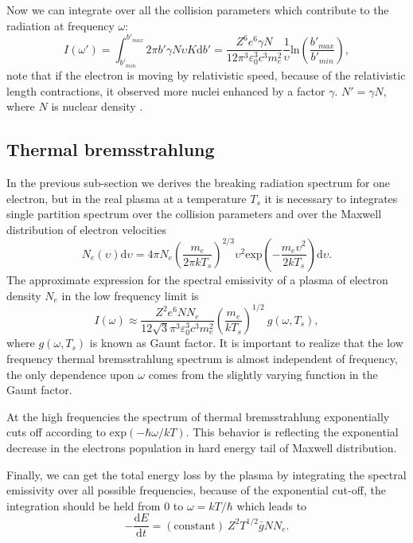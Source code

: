 \documentclass[oneside,a4paper,11pt]{report}
\begin{document}
Now we can integrate over all the collision parameters which contribute to the radiation at frequency 
$\omega$: 
\begin{equation}
 \label{brems_final}
I(\omega') = \int_{b'_{min}}^{b'_{max}} 2 \pi b' \gamma N \upsilon K \mathrm{d}b' = \frac{Z^6 e^6 \gamma N}{12\pi^3 \varepsilon_0^3 c^3 m_e^2} \frac{1}{\upsilon} \mathrm{ln}\left ( \frac{b'_{max}}{b'_{min}} \right ),
\end{equation}
note that if the electron is moving by relativistic speed, because of the relativistic length contractions,
it observed more nuclei enhanced by a factor $\gamma$. $N' = \gamma N$, where $N$ is nuclear density .   

\subsection{Thermal bremsstrahlung}
In the previous sub-section we derives the breaking radiation spectrum for one electron, but in the real plasma 
at a temperature $T_s$ it is necessary to integrates single partition spectrum over the collision parameters 
and over the Maxwell distribution of electron velocities 
\begin{equation}
\label{them_brems}
N_e(\upsilon)\mathrm{d}\upsilon = 4 \pi N_e \left ( \frac{m_e}{2 \pi k T_s} \right )^{2/3}\upsilon^2 \mathrm{exp}\left ( -\frac{m_e \upsilon^2}{2kT_s} \right ) \mathrm{d}\upsilon . 
\end{equation}
The approximate expression for the spectral emissivity of a plasma of electron density $N_e$ in the low 
frequency limit is 
\begin{equation}
 \label{low_f_tbrem}
I(\omega)\approx \frac{Z^2e^6NN_e}{12\sqrt{3}\pi^3\varepsilon_0^3c^3m_e^2}\left ( \frac{m_e}{kT_s} \right )^{1/2} \: g(\omega,T_s),
\end{equation}
where $g(\omega , T_s)$ is known as Gaunt factor.
It is important to realize that the low frequency thermal bremsstrahlung spectrum is almost independent of 
frequency, the only dependence upon $\omega$ comes from the slightly varying function in the Gaunt factor. 

At the high frequencies the spectrum of thermal bremsstrahlung exponentially cuts off according to 
$\mathrm{exp}(-\hbar \omega / kT)$. This behavior is reflecting the exponential decrease in the 
electrons population in hard energy tail of Maxwell distribution. 

Finally, we can get the total energy loss by the plasma by integrating the spectral emissivity over 
all possible frequencies, because of the exponential cut-off, the integration should be held from $0$ to 
$\omega = kT/ \hbar$ which leads to 
\begin{equation}
 \label{brem4}
-\frac{\mathrm{d}E}{\mathrm{d}t} = \mathrm{(constant)} \: Z^2T^{1/2}\bar{g}N N_e .
\end{equation}
\end{document}
